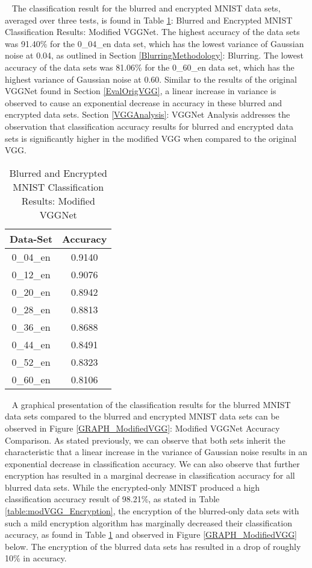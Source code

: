\documentclass[12pt, titlepage]{article}
\begin{document}
~\newpage
\noindent The classification result for the blurred and encrypted MNIST data sets, averaged over three tests, is found in Table \ref{table:modVGG_BlurredEncrypted}: Blurred and Encrypted MNIST Classification Results: Modified VGGNet. The highest accuracy of the data sets was 91.40\% for the 0\_04\_en data set, which has the lowest variance of Gaussian noise at 0.04, as outlined in Section \ref{BlurringMethodology}: Blurring. The lowest accuracy of the data sets was 81.06\% for the 0\_60\_en data set, which has the highest variance of Gaussian noise at 0.60. Similar to the results of the original VGGNet found in Section \ref{EvalOrigVGG}, a linear increase in variance is observed to cause an exponential decrease in accuracy in these blurred and encrypted data sets. Section \ref{VGGAnalysis}: VGGNet Analysis addresses the observation that classification accuracy results for blurred and encrypted data sets is significantly higher in the modified VGG when compared to the original VGG.\\ 

\begin{table}[!h]
	\begin{center}
		\begin{tabular}{| c | c |}
			\hline
			\textbf{Data-Set} & \textbf{Accuracy}\\
			\hline
			0\_04\_en & 0.9140\\
			\hline
			0\_12\_en & 0.9076\\
			\hline
			0\_20\_en & 0.8942\\
			\hline
			0\_28\_en & 0.8813\\
			\hline
			0\_36\_en & 0.8688\\
			\hline
			0\_44\_en & 0.8491\\
			\hline
			0\_52\_en & 0.8323\\
			\hline
			0\_60\_en & 0.8106\\
			\hline
		\end{tabular}
		\caption{Blurred and Encrypted MNIST Classification Results: Modified VGGNet}
		\label{table:modVGG_BlurredEncrypted}
	\end{center}
\end{table} 

~\newpage
\noindent A graphical presentation of the classification results for the blurred MNIST data sets compared to the blurred and encrypted MNIST data sets can be observed in Figure \ref{GRAPH_ModifiedVGG}: Modified VGGNet Accuracy Comparison. As stated previously, we can observe that both sets inherit the characteristic that a linear increase in the variance of Gaussian noise results in an exponential decrease in classification accuracy. We can also observe that further encryption has resulted in a marginal decrease in classification accuracy for all blurred data sets. While the encrypted-only MNIST produced a high classification accuracy result of 98.21\%, as stated in Table \ref{table:modVGG_Encryption}, the encryption of the blurred-only data sets with such a mild encryption algorithm has marginally decreased their classification accuracy, as found in Table \ref{table:modVGG_BlurredEncrypted} and observed in Figure \ref{GRAPH_ModifiedVGG} below. The encryption of the blurred data sets has resulted in a drop of roughly 10\% in accuracy.
\end{document}
